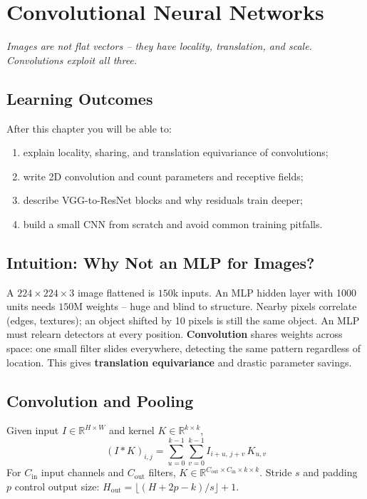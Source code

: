 \chapter{Convolutional Neural Networks}\label{ch:cnn}
\begin{center}\small\textit{Images are not flat vectors -- they have locality, translation, and scale. Convolutions exploit all three.}\end{center}

\noindent{}
\vspace{0.3em}
\section*{Learning Outcomes}
After this chapter you will be able to:
\begin{enumerate}[label=(L\arabic*)]
    \item explain locality, sharing, and translation equivariance of convolutions;
    \item write 2D convolution and count parameters and receptive fields;
    \item describe VGG-to-ResNet blocks and why residuals train deeper;
    \item build a small CNN from scratch and avoid common training pitfalls.
\end{enumerate}

\section{Intuition: Why Not an MLP for Images?}
A $224\times224\times3$ image flattened is $150$k inputs. An MLP hidden layer with 1000 units needs $150$M weights -- huge and blind to structure. Nearby pixels correlate (edges, textures); an object shifted by 10 pixels is still the same object. An MLP must relearn detectors at every position. \textbf{Convolution} shares weights across space: one small filter slides everywhere, detecting the same pattern regardless of location. This gives \textbf{translation equivariance} and drastic parameter savings.

\section{Convolution and Pooling}
\begin{definition}
Given input $I\in\mathbb{R}^{H\times W}$ and kernel $K\in\mathbb{R}^{k\times k}$,
\begin{equation}
(I*K)_{i,j}=\sum_{u=0}^{k-1}\sum_{v=0}^{k-1} I_{i+u,\,j+v}\,K_{u,v}
\end{equation}
For $C_{\text{in}}$ input channels and $C_{\text{out}}$ filters, $K\in\mathbb{R}^{C_{\text{out}}\times C_{\text{in}}\times k\times k}$. Stride $s$ and padding $p$ control output size: $H_{\text{out}}=\lfloor(H+2p-k)/s\rfloor+1$.
\end{definition}

